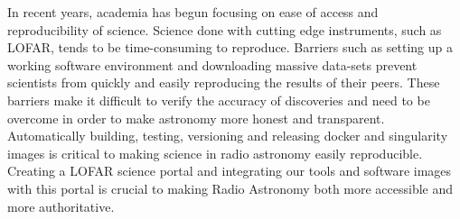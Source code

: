 In recent years, academia has begun focusing on ease of access and reproducibility of science. Science done with cutting edge instruments, such as LOFAR, tends to be time-consuming to reproduce. Barriers such as setting up a working software environment and downloading massive data-sets prevent scientists from quickly and easily reproducing the results of their peers. These barriers make it difficult to verify the accuracy of discoveries and need to be overcome in order to make astronomy more honest and transparent. Automatically building, testing, versioning and releasing docker and singularity images is critical to making science in radio astronomy easily reproducible. Creating a LOFAR science portal and integrating our tools  and software images with this portal is crucial to making Radio Astronomy both more accessible and more authoritative.

